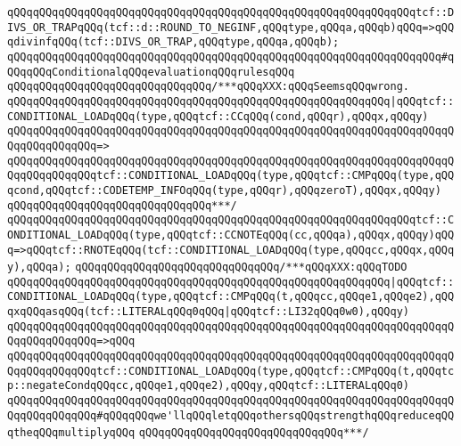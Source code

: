 \verb|qQQqqQQqqQQqqQQqqQQqqQQqqQQqqQQqqQQqqQQqqQQqqQQqqQQqqQQqqQQqqQQqtcf::DIVS_OR_TRAPqQQq(tcf::d::ROUND_TO_NEGINF,qQQqtype,qQQqa,qQQqb)qQQq=>qQQqdivinfqQQq(tcf::DIVS_OR_TRAP,qQQqtype,qQQqa,qQQqb);|\newline
\newline
\verb|qQQqqQQqqQQqqQQqqQQqqQQqqQQqqQQqqQQqqQQqqQQqqQQqqQQqqQQqqQQqqQQqqQQq#qQQqqQQqConditionalqQQqevaluationqQQqrulesqQQq|\newline
\verb|qQQqqQQqqQQqqQQqqQQqqQQqqQQqqQQq/***qQQqXXX:qQQqSeemsqQQqwrong.|\newline
\verb|qQQqqQQqqQQqqQQqqQQqqQQqqQQqqQQqqQQqqQQqqQQqqQQqqQQqqQQqqQQq|\verb#|qQQqtcf::CONDITIONAL_LOADqQQq(type,qQQqtcf::CCqQQq(cond,qQQqr),qQQqx,qQQqy)#\newline
\verb|qQQqqQQqqQQqqQQqqQQqqQQqqQQqqQQqqQQqqQQqqQQqqQQqqQQqqQQqqQQqqQQqqQQqqQQqqQQqqQQqqQQq=>|\newline
\verb|qQQqqQQqqQQqqQQqqQQqqQQqqQQqqQQqqQQqqQQqqQQqqQQqqQQqqQQqqQQqqQQqqQQqqQQqqQQqqQQqqQQqtcf::CONDITIONAL_LOADqQQq(type,qQQqtcf::CMPqQQq(type,qQQqcond,qQQqtcf::CODETEMP_INFOqQQq(type,qQQqr),qQQqzeroT),qQQqx,qQQqy)|\newline
\verb|qQQqqQQqqQQqqQQqqQQqqQQqqQQqqQQq***/|\newline
\verb|qQQqqQQqqQQqqQQqqQQqqQQqqQQqqQQqqQQqqQQqqQQqqQQqqQQqqQQqqQQqqQQqtcf::CONDITIONAL_LOADqQQq(type,qQQqtcf::CCNOTEqQQq(cc,qQQqa),qQQqx,qQQqy)qQQq=>qQQqtcf::RNOTEqQQq(tcf::CONDITIONAL_LOADqQQq(type,qQQqcc,qQQqx,qQQqy),qQQqa);|\newline
\verb|qQQqqQQqqQQqqQQqqQQqqQQqqQQqqQQq/***qQQqXXX:qQQqTODO|\newline
\verb|qQQqqQQqqQQqqQQqqQQqqQQqqQQqqQQqqQQqqQQqqQQqqQQqqQQqqQQqqQQq|\verb#|qQQqtcf::CONDITIONAL_LOADqQQq(type,qQQqtcf::CMPqQQq(t,qQQqcc,qQQqe1,qQQqe2),qQQqxqQQqasqQQq(tcf::LITERALqQQq0qQQq|qQQqtcf::LI32qQQq0w0),qQQqy)#\newline
\verb|qQQqqQQqqQQqqQQqqQQqqQQqqQQqqQQqqQQqqQQqqQQqqQQqqQQqqQQqqQQqqQQqqQQqqQQqqQQqqQQqqQQq=>qQQq|\newline
\verb|qQQqqQQqqQQqqQQqqQQqqQQqqQQqqQQqqQQqqQQqqQQqqQQqqQQqqQQqqQQqqQQqqQQqqQQqqQQqqQQqqQQqtcf::CONDITIONAL_LOADqQQq(type,qQQqtcf::CMPqQQq(t,qQQqtcp::negateCondqQQqcc,qQQqe1,qQQqe2),qQQqy,qQQqtcf::LITERALqQQq0)|\newline
\verb|qQQqqQQqqQQqqQQqqQQqqQQqqQQqqQQqqQQqqQQqqQQqqQQqqQQqqQQqqQQqqQQqqQQqqQQqqQQqqQQqqQQq#qQQqqQQqwe'llqQQqletqQQqothersqQQqstrengthqQQqreduceqQQqtheqQQqmultiplyqQQq|\newline
\verb|qQQqqQQqqQQqqQQqqQQqqQQqqQQqqQQq***/|\newline
